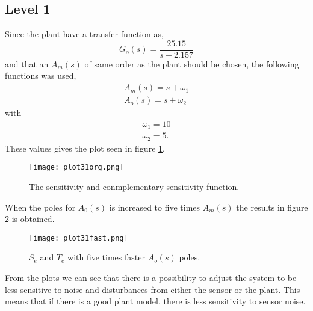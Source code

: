 \subsection*{Level 1}
Since the plant have a transfer function as,
\begin{equation}
  G_o(s)=\frac{25.15}{s+2.157}
\end{equation}
and that an $A_m(s)$ of same order as the plant should be chosen, the
following functions was used,
\begin{align*}
    A_m(s)=s+\omega_1 \\
    A_o(s)=s+\omega_2
\end{align*}
with
\begin{align*}
    \omega_1 = 10 \\
    \omega_2 = 5.
\end{align*}
These values gives the plot seen in figure \ref{fig:sens31org}.
\begin{figure}[H]
  \centering
  \texttt{[image: plot31org.png]}
  \caption{The sensitivity and conmplementary sensitivity function.}
  \label{fig:sens31org}
\end{figure}
When the poles for $A_0(s)$ is increased to five times $A_m(s)$ the
results in figure \ref{fig:sens31fast} is obtained. 
\begin{figure}[H]
    \centering
    \texttt{[image: plot31fast.png]}
    \caption{$S_e$ and $T_e$ with five times faster $A_o(s)$ poles.}
    \label{fig:sens31fast}
\end{figure}
From the plots we can see that there is a possibility to adjust the
system to be less sensitive to noise and disturbances from either the
sensor or the plant. This means that if there is a good plant model,
there is less sensitivity to sensor noise.
